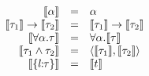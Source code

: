 
\[
\begin{array}{rcl}
  \image \alpha                     & = & \alpha \\
  \image {\ty_1} \to \image {\ty_2} & = & \image {\ty_1} \to \image {\ty_2} \\
  \image {\forall \alpha. \ty}      & = & \forall \alpha. \image \ty \\
  \image {\ty_1 \intersects \ty_2}  & = & \tupled {\image {\ty_1}, \image {\ty_2}} \\
  \image {\recordtype l \ty}        & = & \image t
\end{array}
\]